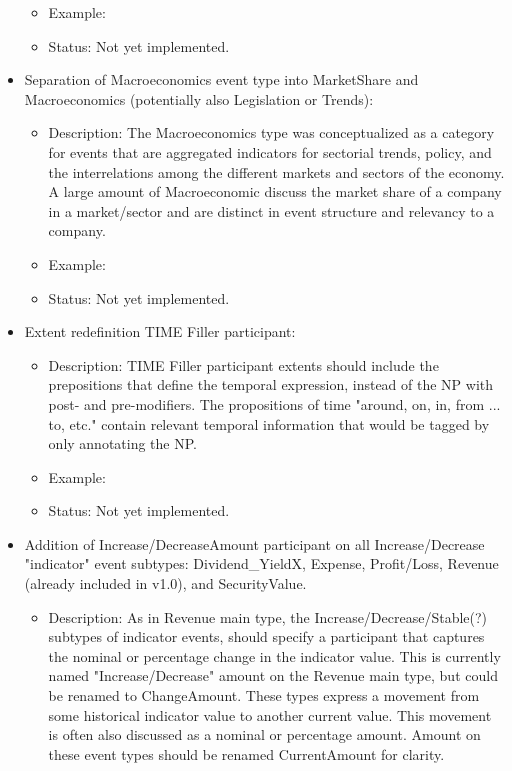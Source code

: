 \begin{itemize}[leftmargin=*]
\begin{itemize}
            \item Example: 
            \item Status: Not yet implemented.
        \end{itemize}
    \item Separation of Macroeconomics event type into MarketShare and Macroeconomics (potentially also Legislation or Trends):
        \begin{itemize} 
            \item Description: The Macroeconomics type was conceptualized as a category for events that are aggregated indicators for sectorial trends, policy, and the interrelations among the different markets and sectors of the economy. A large amount of Macroeconomic discuss the market share of a company in a market/sector and are distinct in event structure and relevancy to a company.
            \item Example: 
            \item Status: Not yet implemented.
        \end{itemize}
    \item Extent redefinition TIME Filler participant:
        \begin{itemize} 
            \item Description: TIME Filler participant extents should include the prepositions that define the temporal expression, instead of the NP with post- and pre-modifiers. The propositions of time "around, on, in, from ... to, etc." contain relevant temporal information that would be tagged by only annotating the NP.
            \item Example: 
            \item Status: Not yet implemented.
        \end{itemize}
    \item Addition of Increase/DecreaseAmount participant on all Increase/Decrease "indicator" event subtypes: Dividend\_YieldX, Expense, Profit/Loss, Revenue (already included in v1.0), and SecurityValue.
        \begin{itemize}
            \item Description: As in Revenue main type, the Increase/Decrease/Stable(?) subtypes of indicator events, should specify a participant that captures the nominal or percentage change in the indicator value. This is currently named "Increase/Decrease" amount on the Revenue main type, but could be renamed to ChangeAmount. These types express a movement from some historical indicator value to another current value. This movement is often also discussed as a nominal or percentage amount. Amount on these event types should be renamed CurrentAmount for clarity.

\end{itemize}
\end{itemize}
